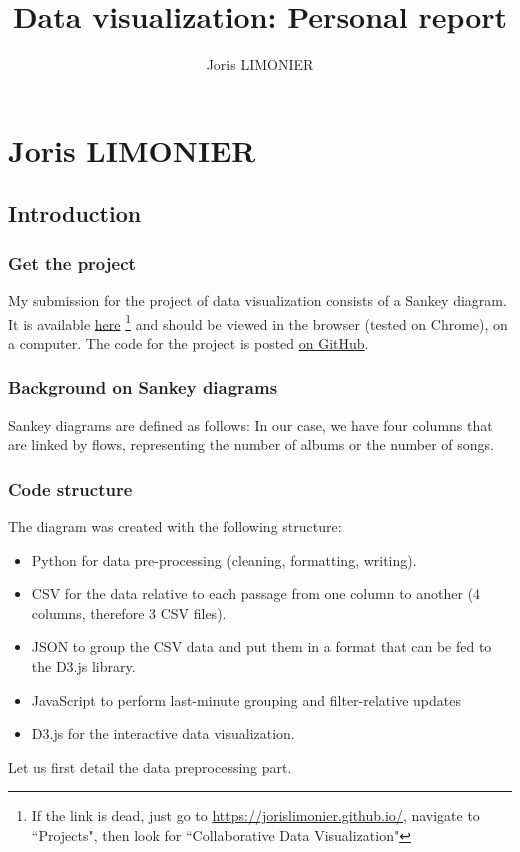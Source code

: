 \documentclass{article}
\title{Data visualization: Personal report}
\author{Joris LIMONIER}
\begin{document}
\maketitle

\tableofcontents
\newpage

\section{Joris LIMONIER}

\subsection{Introduction}
\subsubsection{Get the project}
My submission for the project of data visualization consists of a Sankey diagram. It is available \href{https://jorislimonier.github.io/projects/collab-data-vis/index.html}{here} \footnote{If the link is dead, just go to \href{https://jorislimonier.github.io/}{https://jorislimonier.github.io/}, navigate to ``Projects", then look for ``Collaborative Data Visualization"} and should be viewed in the browser (tested on Chrome), on a computer. The code for the project is posted \href{https://github.com/jorislimonier/collab-viz/tree/main/joris}{on GitHub}.

\subsubsection{Background on Sankey diagrams}
Sankey diagrams are defined as follows:  \cite{noauthor_sankey_2021} In our case, we have four columns that are linked by flows, representing the number of albums or the number of songs.

\subsubsection{Code structure}
The diagram was created with the following structure:

\begin{itemize}
    \item Python \cite{van2000python} for data pre-processing (cleaning, formatting, writing).
    \item CSV for the data relative to each passage from one column to another (4 columns, therefore 3 CSV files).
    \item JSON to group the CSV data and put them in a format that can be fed to the D3.js library.
    \item JavaScript to perform last-minute grouping and filter-relative updates
    \item D3.js \cite{bostock_d_2011} for the interactive data visualization.
\end{itemize}
Let us first detail the data preprocessing part.
\end{document}
